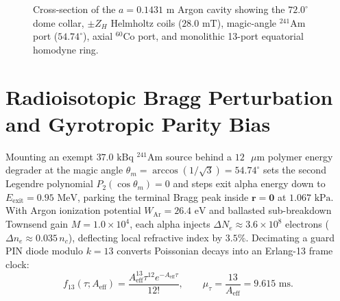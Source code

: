 \documentclass[aps,pra,twocolumn,superscriptaddress,nofootinbib,10pt]{revtex4-2}
\begin{document}
\begin{figure}[t]
\centering
{}
\caption{Cross-section of the $a = 0.1431\text{ m}$ Argon cavity showing the
$72.0^\circ$ dome collar, $\pm Z_H$ Helmholtz coils ($28.0\text{ mT}$),
magic-angle $^{241}\text{Am}$ port ($54.74^\circ$), axial $^{60}\text{Co}$ port,
and monolithic 13-port equatorial homodyne ring.}
\label{fig:cavity}
\end{figure}

\section{Radioisotopic Bragg Perturbation and Gyrotropic Parity Bias}

Mounting an exempt $37.0\text{ kBq}$ $^{241}\text{Am}$ source behind a
$12\text{ }\mu\text{m}$ polymer energy degrader at the magic angle
$\theta_m = \arccos(1/\sqrt{3}) = 54.74^\circ$ sets the second Legendre
polynomial $P_2(\cos\theta_m) = 0$ and steps exit alpha energy down to
$E_{\text{exit}} = 0.95\text{ MeV}$, parking the terminal Bragg peak inside
$\bm{r} = \bm{0}$ at $1.067\text{ kPa}$. With Argon ionization potential
$W_{\text{Ar}} = 26.4\text{ eV}$ and ballasted sub-breakdown Townsend gain
$M = 1.0 \times 10^4$, each alpha injects $\Delta N_e \approx 3.6 \times 10^8$
electrons ($\Delta n_e \approx 0.035\,n_c$), deflecting local refractive index
by $3.5\%$. Decimating a guard PIN diode modulo $k = 13$ converts Poissonian
decays into an Erlang-13 frame clock:
\begin{equation}
f_{13}(\tau; A_{\text{eff}})
= \frac{A_{\text{eff}}^{13}\tau^{12}e^{-A_{\text{eff}}\tau}}{12!},
\qquad \mu_\tau = \frac{13}{A_{\text{eff}}} = 9.615\text{ ms}.
\label{eq:erlang}
\end{equation}
\end{document}
